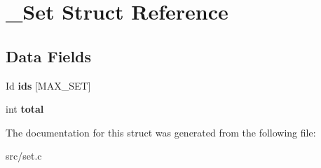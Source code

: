 \hypertarget{struct__Set}{}\section{\+\_\+\+Set Struct Reference}
\label{struct__Set}
\subsection*{Data Fields}
\begin{DoxyCompactItemize}
\item 
\mbox{\label{struct__Set_a3b2034bbfee5ca2b0dde5b6073c264cc}} 
Id {\bfseries ids} \mbox{[}M\+A\+X\+\_\+\+S\+ET\mbox{]}
\item 
\mbox{\label{struct__Set_a9ae5f2cab9df62f0a98dd683be804878}} 
int {\bfseries total}
\end{DoxyCompactItemize}


The documentation for this struct was generated from the following file\+:\begin{DoxyCompactItemize}
\item 
src/set.\+c\end{DoxyCompactItemize}
